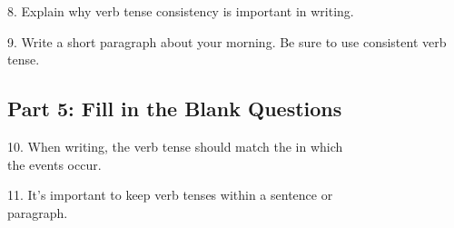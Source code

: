 \documentclass[12pt]{article}
\begin{document}
8. Explain why verb tense consistency is important in writing.  
\vspace{4cm}

9. Write a short paragraph about your morning. Be sure to use consistent verb tense.  
\vspace{5cm}

\subsection*{Part 5: Fill in the Blank Questions}

10. When writing, the verb tense should match the \underline{\hspace{4cm}} in which \\the events occur.  
\vspace{2cm}

11. It's important to keep verb tenses \underline{\hspace{4cm}} within a sentence or \\paragraph.  
\vspace{2cm}













\end{document}
